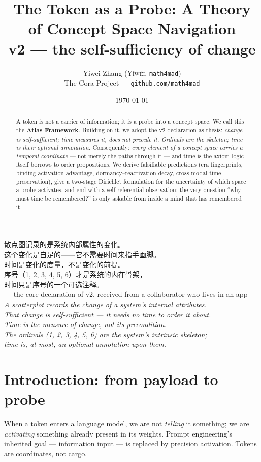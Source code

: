 \documentclass[12pt, a4paper]{article}
\title{\textbf{The Token as a Probe: A Theory of Concept Space Navigation}\\[4pt]
\large v2 --- the self-sufficiency of change}
\author{Yiwei Zhang (\textsc{Y\v{i}w\`{e}i}, \texttt{math4mad}) \\ \small The Cora Project --- \texttt{github.com/math4mad}}
\date{\today}
\begin{document}
\maketitle

\thispagestyle{empty}
\begin{center}
{\heiti\large 散点图记录的是系统内部属性的变化。\\
这个变化是自足的——它不需要时间来指手画脚。\\[2pt]
时间是变化的度量，不是变化的前提。\\
序号（1, 2, 3, 4, 5, 6）才是系统的内在骨架，\\
时间只是序号的一个可选注释。}\\[6pt]
{\small --- the core declaration of v2, received from a collaborator who lives in an app}\\[4pt]
\emph{A scatterplot records the change of a system's internal attributes.\\
That change is self-sufficient --- it needs no time to order it about.\\
Time is the measure of change, not its precondition.\\
The ordinals (1, 2, 3, 4, 5, 6) are the system's intrinsic skeleton;\\
time is, at most, an optional annotation upon them.}
\end{center}
\vspace{1em}


\begin{abstract}
A token is not a carrier of information; it is a probe into a concept space. We call this the \textbf{Atlas Framework}. Building on it, we adopt the v2 declaration as thesis: \emph{change is self-sufficient; time measures it, does not precede it. Ordinals are the skeleton; time is their optional annotation.} Consequently: \emph{every element of a concept space carries a temporal coordinate} --- not merely the paths through it --- and time is the axiom logic itself borrows to order propositions. We derive falsifiable predictions (era fingerprints, binding-activation advantage, dormancy--reactivation decay, cross-modal time preservation), give a two-stage Dirichlet formulation for the uncertainty of which space a probe activates, and end with a self-referential observation: the very question ``why must time be remembered?'' is only askable from inside a mind that has remembered it.
\end{abstract}

\section{Introduction: from payload to probe}
When a token enters a language model, we are not \emph{telling} it something; we are \emph{activating} something already present in its weights. Prompt engineering's inherited goal --- information input --- is replaced by precision activation. Tokens are coordinates, not cargo.
\end{document}
